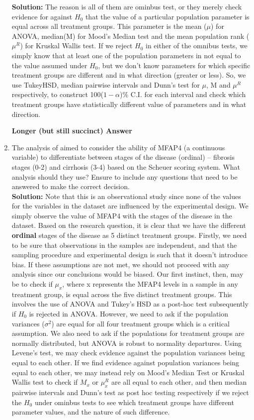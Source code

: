 \documentclass{article}
\begin{document}
\begin{enumerate}
\begin{minipage}[t][1.1in][t]{\textwidth}
    \textbf{Solution:} The reason is all of them are ominbus test, or they merely check evidence for against $H_{0}$ that the value of a particular population parameter is equal across all treatment groups. This parameter is the mean ($\mu$) for ANOVA, median(M) for Mood's Median test and the mean population rank ($\mu^{R}$) for Kruskal Wallis test. If we reject $H_{0}$ in either of the omnibus tests, we simply know that at least one of the population parameters in not equal to the value assumed under $H_{0}$, but we don't know parameters for which specific treatment groups are different and in what direction (greater or less). So, we use TukeyHSD, median pairwise intervals and Dunn's test for $\mu$, M and $\mu^{R}$ respectively, to construct 100($1-\alpha$)\% C.I. for each interval and check which treatment groups have statistically different value of parameters and in what direction.
    \end{minipage}
\newpage
  \textbf{Longer (but still succinct) Answer} 
  \item The analysis of \cite{Bracht16} aimed to consider the ability of MFAP4 (a continuous variable) 
  to differentiate between stages of the disease (ordinal) -- fibrosis stages (0-2) and cirrhosis (3-4) 
  based on the Scheuer scoring system. What analysis should they use? Ensure to include any questions
  that need to be answered to make the correct decision.\\
    \textbf{Solution:} Note that this is an observational study since none of the values for the variables in the dataset are influenced by the experimental design. We simply observe the value of MFAP4 with the stages of the disease in the dataset. Based on the research question, it is clear that we have the different \textbf{ordinal} stages of the disease as 5 distinct treatment groups. Firstly, we need to be sure that observations in the samples are independent, and that the sampling procedure and experimental design is such that it doesn't introduce bias. If these assumptions are not met, we should not proceed with any analysis since our conclusions would be biased. Our first instinct, then, may be to check if $\mu_{x}$, where x represents the MFAP4 levels in a sample in any treatment group, is equal across the five distinct treatment groups. This involves the use of ANOVA and Tukey's HSD as a post-hoc test subsequently if $H_{0}$ is rejected in ANOVA. However, we need to ask if the population variances ($\sigma^2$) are equal for all four treatment groups which is a critical assumption. We also need to ask if the populations for treatment groups are normally distributed, but ANOVA is robust to normality departures. Using Levene's test, we may check evidence against the population variances being equal to each other. If we find evidence against population variances being equal to each other, we may instead rely on Mood's Median Test or Kruskal Wallis test to check if $M_{x}$ or $\mu_{x}^R$ are all equal to each other, and then median pairwise intervals and Dunn's test as post hoc testing respectively if we reject the $H_{0}$ under ominbus tests to see which treatment groups have different parameter values, and the nature of such difference.
\end{enumerate}


\end{document}
